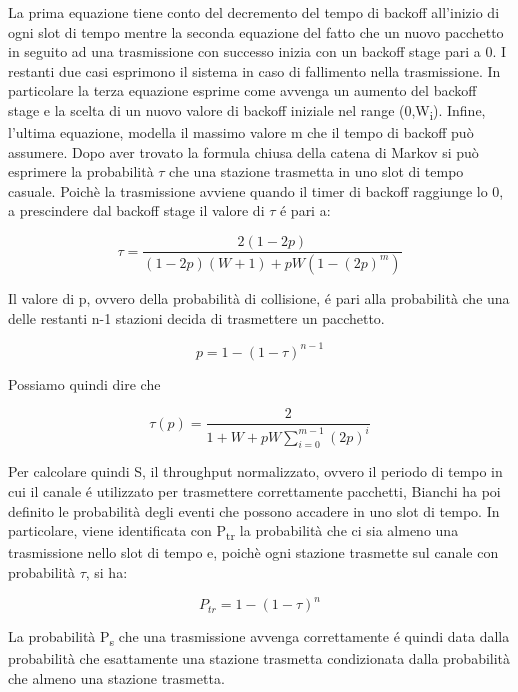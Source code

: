 La prima equazione tiene conto del decremento del tempo di backoff all'inizio di ogni slot di tempo mentre la seconda equazione del fatto che un nuovo pacchetto in seguito ad una trasmissione con successo inizia con un backoff stage pari a 0.
I restanti due casi esprimono il sistema in caso di fallimento nella trasmissione.
In particolare la terza equazione esprime come avvenga un aumento del backoff stage e la scelta di un nuovo valore di backoff iniziale nel range (0,W\textsubscript{i}).
Infine, l'ultima equazione, modella il massimo valore m che il tempo di backoff pu\`o assumere.
Dopo aver trovato la formula chiusa della catena di Markov si pu\`o esprimere la probabilit\`a $\tau$ che una stazione trasmetta in uno slot di tempo casuale.
Poich\`e la trasmissione avviene quando il timer di backoff raggiunge lo 0, a prescindere dal backoff stage il valore di $\tau$ \'e pari a:


\begin{equation}
\tau = \frac{2(1-2p)}{(1-2p)(W+1)+pW(1-(2p)^m)}
\end{equation}

Il valore di p, ovvero della probabilit\`a di collisione, \'e pari alla probabilit\`a che una delle restanti n-1 stazioni decida di trasmettere un pacchetto.

\begin{equation}
p =1-(1-\tau)^{n-1}
\end{equation}

Possiamo quindi dire che 

\begin{equation}
\tau(p) = \frac{2}{1+W+pW \sum_{i=0}^{m-1}(2p)^i}
\end{equation}

Per calcolare quindi S, il throughput normalizzato, ovvero il periodo di tempo in cui il canale \'e utilizzato per trasmettere correttamente pacchetti, Bianchi ha poi definito le probabilit\`a degli eventi che possono accadere in uno slot di tempo.
In particolare, viene identificata con P\textsubscript{tr} la probabilit\`a che ci sia almeno una trasmissione nello slot di tempo e, poich\`e ogni stazione trasmette sul canale con probabilit\`a $\tau$, si ha:

\begin{equation}
P_{tr} = 1-(1-\tau)^n
\end{equation}

La probabilit\`a P\textsubscript{s} che una trasmissione avvenga correttamente \'e quindi data dalla probabilit\`a che esattamente una stazione trasmetta condizionata dalla probabilit\`a che almeno una stazione trasmetta.

